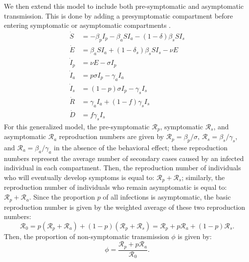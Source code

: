 \documentclass[12pt]{article}
\newcommand{\RR}{\ensuremath{{\mathcal R}}\xspace}
\begin{document}
We then extend this model to include both pre-symptomatic and asymptomatic transmission.
This is done by adding a presymptomatic compartment before entering symptomatic or asymptomatic compartments \citep{lavezzo2020}.
\begin{align}
\dot{S} &= -\beta_p I_p -\beta_a S I_a -(1-\delta) \beta_s S I_s \\
\dot{E} &= \beta_a S I_a + (1-\delta_s) \beta_s S I_s - \nu E\\
\dot{I}_p &= \nu E - \sigma I_p\\
\dot{I}_a &= p \sigma I_p - \gamma_a I_a\\
\dot{I}_s &= (1-p) \sigma I_p -\gamma_s I_s\\
\dot{R} &= \gamma_a I_a + (1-f) \gamma_s I_s \\
\dot{D} &= f \gamma_s I_s
\end{align}
For this generalized model, the pre-symptomatic $\RR_p$, symptomatic $\RR_s$, and asymptomatic $\RR_a$ reproduction numbers are given by $\RR_p = \beta_p/\sigma$, $\RR_s=\beta_s/\gamma_s$, and $\RR_a=\beta_a/\gamma_a$ in the absence of the behavioral effect;
these reproduction numbers represent the average number of secondary cases caused by an infected individual in each compartment.
Then, the reproduction number of individuals who will eventually develop symptoms is equal to: $\RR_p + \RR_s$;
similarly, the reproduction number of individuals who remain asymptomatic is equal to: $\RR_p + \RR_a$.
Since the proportion $p$ of all infections is asymptomatic, the basic reproduction number is given by the weighted average of these two reproduction numbers: 
\begin{equation}
\RR_0 = p(\RR_p + \RR_a) + (1-p) (\RR_p + \RR_s) = \RR_p + p \RR_a + (1-p) \RR_s.
\end{equation}
Then, the proportion of non-symptomatic transmission $\phi$ is given by:
\begin{equation}
\phi = \frac{\RR_p + p \RR_a}{\RR_0}.
\end{equation}
\end{document}
